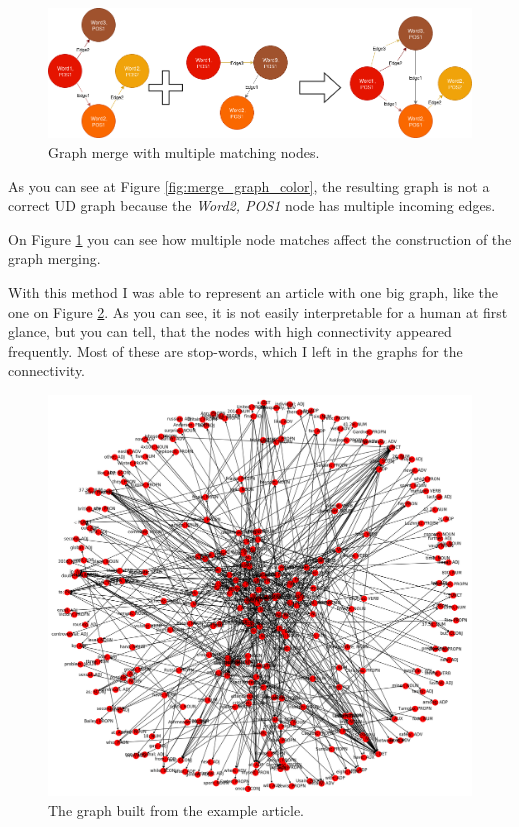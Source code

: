 \begin{figure}[!ht]
	\centering
	\includegraphics[width=150mm, keepaspectratio]{figures/merge_graphs_color_multiple.png}
	\caption{Graph merge with multiple matching nodes.}
	\label{fig:merge_graph_color_multiple}
\end{figure}

As you can see at Figure \ref{fig:merge_graph_color}, the resulting graph is not a correct UD graph because the \textit{Word2, POS1} node has multiple incoming edges.

On Figure \ref{fig:merge_graph_color_multiple} you can see how multiple node matches affect the construction of the graph merging.

With this method I was able to represent an article with one big graph, like the one on Figure \ref{fig:usain_article_graph}. As you can see, it is not easily interpretable for a human at first glance, but you can tell, that the nodes with high connectivity appeared frequently. Most of these are stop-words, which I left in the graphs for the connectivity.

\begin{figure}[!ht]
	\centering
	\includegraphics[width=150mm, keepaspectratio]{figures/usain_bolt_article.png}
	\caption{The graph built from the example article.}
	\label{fig:usain_article_graph}
\end{figure}

